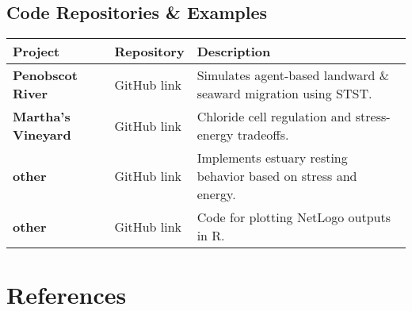 \documentclass[
]{book}
\begin{document}
\section{Code Repositories \& Examples}\label{code-repositories-examples}

\begin{longtable}[]{@{}
  >{\raggedright\arraybackslash}p{}
  >{\raggedright\arraybackslash}p{}
  >{\raggedright\arraybackslash}p{}@{}}
\toprule\noalign{}
\begin{minipage}[b]{\linewidth}\raggedright
Project
\end{minipage} & \begin{minipage}[b]{\linewidth}\raggedright
Repository
\end{minipage} & \begin{minipage}[b]{\linewidth}\raggedright
Description
\end{minipage} \\
\midrule\noalign{}
\endhead
\bottomrule\noalign{}
\endlastfoot
\textbf{Penobscot River} & GitHub link & Simulates agent-based landward \& seaward migration using STST. \\
\textbf{Martha's Vineyard} & GitHub link & Chloride cell regulation and stress-energy tradeoffs. \\
\textbf{other} & GitHub link & Implements estuary resting behavior based on stress and energy. \\
\textbf{other} & GitHub link & Code for plotting NetLogo outputs in R. \\
\end{longtable}

\chapter*{References}\label{references}


\end{document}

